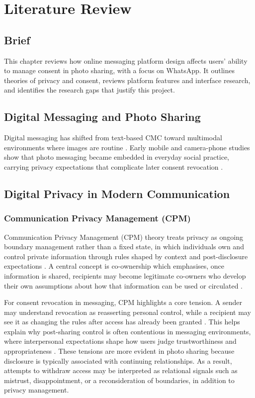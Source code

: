 
\chapter{Literature Review}

\section{Brief}
This chapter reviews how online messaging platform design affects users’ ability to manage consent in photo sharing, with a focus on WhatsApp. It outlines theories of privacy and consent, reviews platform features and interface research, and identifies the research gaps that justify this project.

\section{Digital Messaging and Photo Sharing} 
Digital messaging has shifted from text-based CMC toward multimodal environments where images are routine \cite{Herring2019Coevolution}. Early mobile and camera-phone studies show that photo messaging became embedded in everyday social practice, carrying privacy expectations that complicate later consent revocation \cite{kindberg_i_2005}.

\section{Digital Privacy in Modern Communication}

\subsection{Communication Privacy Management (CPM)}

Communication Privacy Management (CPM) theory treats privacy as ongoing boundary management rather than a fixed state, in which individuals own and control private information through rules shaped by context and post-disclosure expectations \cite{child_petronio_cmc_privacy_2011, petronio_cpm_2020}. A central concept is co-ownership which emphasises, once information is shared, recipients may become legitimate co-owners who develop their own assumptions about how that information can be used or circulated \cite{petronio_cpm_2020}. 

For consent revocation in messaging, CPM highlights a core tension. A sender may understand revocation as reasserting personal control, while a recipient may see it as changing the rules after access has already been granted \cite{petronio_cpm_2020}. This helps explain why post-sharing control is often contentious in messaging environments, where interpersonal expectations shape how users judge trustworthiness and appropriateness \cite{child_petronio_cmc_privacy_2011, petronio_cpm_2020}. These tensions are more evident in photo sharing because disclosure is typically associated with continuing relationships. As a result, attempts to withdraw access may be interpreted as relational signals such as mistrust, disappointment, or a reconsideration of boundaries, in addition to privacy management. 

